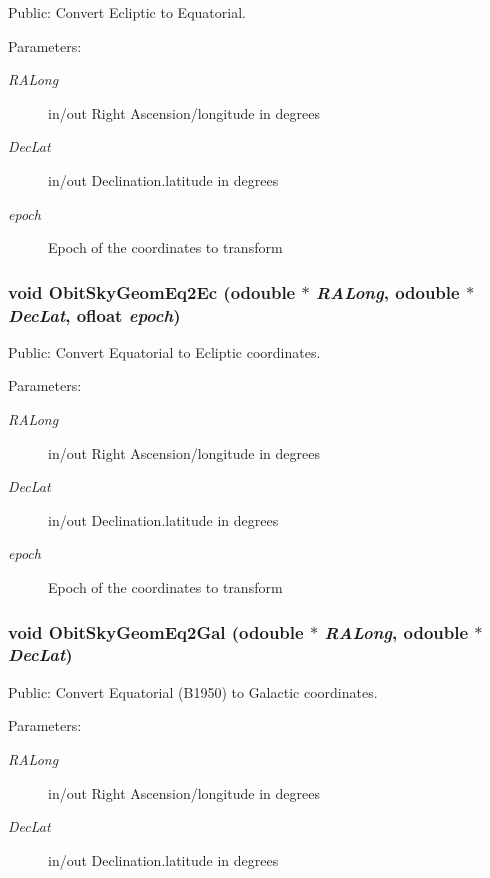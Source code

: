 Public: Convert Ecliptic to Equatorial. 

\begin{Desc}
\item[Parameters:]
\begin{description}
\item[{\em RALong}]in/out Right Ascension/longitude in degrees \item[{\em Dec\-Lat}]in/out Declination.latitude in degrees \item[{\em epoch}]Epoch of the coordinates to transform \end{description}
\end{Desc}
\subsubsection{\setlength{\rightskip}{0pt plus 5cm}void Obit\-Sky\-Geom\-Eq2Ec ({\bf odouble} $\ast$ {\em RALong}, {\bf odouble} $\ast$ {\em Dec\-Lat}, {\bf ofloat} {\em epoch})}\label{ObitSkyGeom_8h_a23}


Public: Convert Equatorial to Ecliptic coordinates. 

\begin{Desc}
\item[Parameters:]
\begin{description}
\item[{\em RALong}]in/out Right Ascension/longitude in degrees \item[{\em Dec\-Lat}]in/out Declination.latitude in degrees \item[{\em epoch}]Epoch of the coordinates to transform \end{description}
\end{Desc}
\subsubsection{\setlength{\rightskip}{0pt plus 5cm}void Obit\-Sky\-Geom\-Eq2Gal ({\bf odouble} $\ast$ {\em RALong}, {\bf odouble} $\ast$ {\em Dec\-Lat})}\label{ObitSkyGeom_8h_a21}


Public: Convert Equatorial (B1950) to Galactic coordinates. 

\begin{Desc}
\item[Parameters:]
\begin{description}
\item[{\em RALong}]in/out Right Ascension/longitude in degrees \item[{\em Dec\-Lat}]in/out Declination.latitude in degrees \end{description}
\end{Desc}
